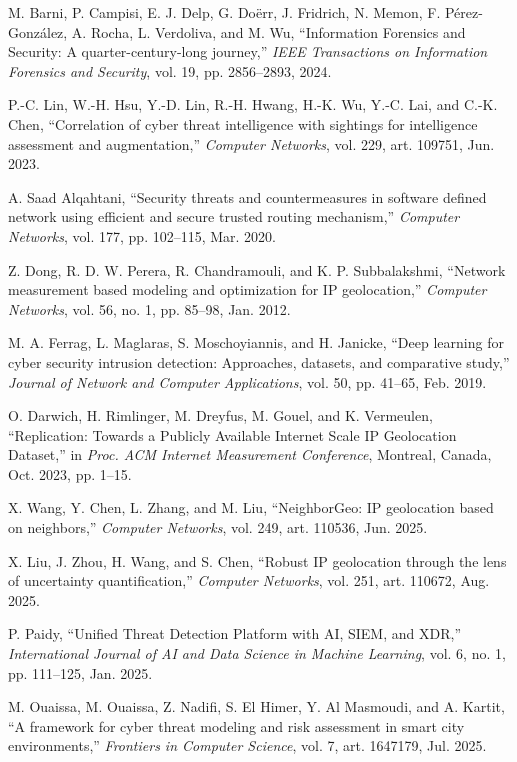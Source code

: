 \begin{thebibliography}{15}
M. Barni, P. Campisi, E. J. Delp, G. Doërr, J. Fridrich, N. Memon, F. Pérez-González, A. Rocha, L. Verdoliva, and M. Wu, ``Information Forensics and Security: A quarter-century-long journey,'' \textit{IEEE Transactions on Information Forensics and Security}, vol. 19, pp. 2856--2893, 2024.

P.-C. Lin, W.-H. Hsu, Y.-D. Lin, R.-H. Hwang, H.-K. Wu, Y.-C. Lai, and C.-K. Chen, ``Correlation of cyber threat intelligence with sightings for intelligence assessment and augmentation,'' \textit{Computer Networks}, vol. 229, art. 109751, Jun. 2023.

A. Saad Alqahtani, ``Security threats and countermeasures in software defined network using efficient and secure trusted routing mechanism,'' \textit{Computer Networks}, vol. 177, pp. 102--115, Mar. 2020.

Z. Dong, R. D. W. Perera, R. Chandramouli, and K. P. Subbalakshmi, ``Network measurement based modeling and optimization for IP geolocation,'' \textit{Computer Networks}, vol. 56, no. 1, pp. 85--98, Jan. 2012.

M. A. Ferrag, L. Maglaras, S. Moschoyiannis, and H. Janicke, ``Deep learning for cyber security intrusion detection: Approaches, datasets, and comparative study,'' \textit{Journal of Network and Computer Applications}, vol. 50, pp. 41--65, Feb. 2019.

O. Darwich, H. Rimlinger, M. Dreyfus, M. Gouel, and K. Vermeulen, ``Replication: Towards a Publicly Available Internet Scale IP Geolocation Dataset,'' in \textit{Proc. ACM Internet Measurement Conference}, Montreal, Canada, Oct. 2023, pp. 1--15.

X. Wang, Y. Chen, L. Zhang, and M. Liu, ``NeighborGeo: IP geolocation based on neighbors,'' \textit{Computer Networks}, vol. 249, art. 110536, Jun. 2025.

X. Liu, J. Zhou, H. Wang, and S. Chen, ``Robust IP geolocation through the lens of uncertainty quantification,'' \textit{Computer Networks}, vol. 251, art. 110672, Aug. 2025.

P. Paidy, ``Unified Threat Detection Platform with AI, SIEM, and XDR,'' \textit{International Journal of AI and Data Science in Machine Learning}, vol. 6, no. 1, pp. 111--125, Jan. 2025.

M. Ouaissa, M. Ouaissa, Z. Nadifi, S. El Himer, Y. Al Masmoudi, and A. Kartit, ``A framework for cyber threat modeling and risk assessment in smart city environments,'' \textit{Frontiers in Computer Science}, vol. 7, art. 1647179, Jul. 2025.


\end{thebibliography}
